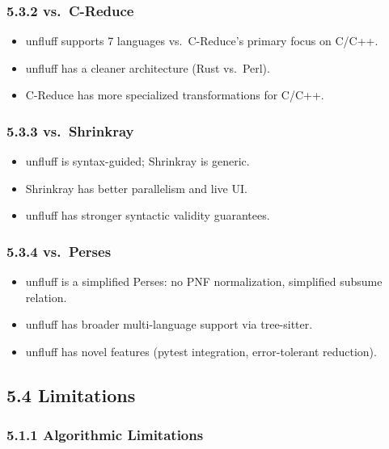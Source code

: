 \documentclass[
  letterpaper,
]{article}
\providecommand{\tightlist}{%
  \setlength{\itemsep}{0pt}\setlength{\parskip}{0pt}}
\begin{document}
\subsubsection{5.3.2 vs.~C-Reduce}\label{vs.-c-reduce}

\begin{itemize}
\tightlist
\item
  unfluff supports 7 languages vs.~C-Reduce's primary focus on C/C++.
\item
  unfluff has a cleaner architecture (Rust vs.~Perl).
\item
  C-Reduce has more specialized transformations for C/C++.
\end{itemize}

\subsubsection{5.3.3 vs.~Shrinkray}\label{vs.-shrinkray}

\begin{itemize}
\tightlist
\item
  unfluff is syntax-guided; Shrinkray is generic.
\item
  Shrinkray has better parallelism and live UI.
\item
  unfluff has stronger syntactic validity guarantees.
\end{itemize}

\subsubsection{5.3.4 vs.~Perses}\label{vs.-perses}

\begin{itemize}
\tightlist
\item
  unfluff is a simplified Perses: no PNF normalization, simplified
  subsume relation.
\item
  unfluff has broader multi-language support via tree-sitter.
\item
  unfluff has novel features (pytest integration, error-tolerant
  reduction).
\end{itemize}

\subsection{5.4 Limitations}\label{limitations}

\subsubsection{5.1.1 Algorithmic
Limitations}\label{algorithmic-limitations}
\end{document}
